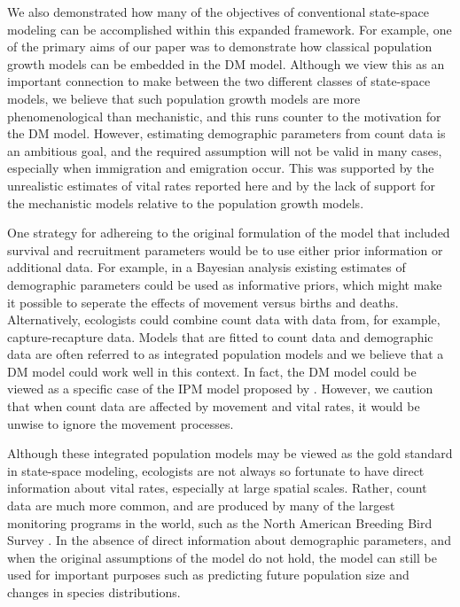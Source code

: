 \documentclass[12pt]{article}
\begin{document}
We also demonstrated how many of the objectives of conventional
state-space modeling can be accomplished within this expanded
framework. For example, one of the
primary aims of our paper was to demonstrate how classical
population growth models can be embedded in the DM model. Although we
view this as an important connection to make between the two different
classes of state-space models, we believe that
such population growth models are more phenomenological
than mechanistic, and this runs counter to the motivation for the DM
model. However, estimating
demographic parameters from count data is an ambitious goal, and
the required assumption will not be valid in many cases, especially
when immigration and emigration occur. This was supported by the
unrealistic estimates of vital rates reported here and by the lack of
support for the mechanistic models relative to the population growth
models.

One strategy for adhereing to the original formulation of the model
that included survival and recruitment parameters would be to use
either prior information or additional data. For example, in a
Bayesian analysis existing estimates of demographic parameters could
be used as informative priors, which might make it possible to
seperate the effects of movement versus births and deaths.
Alternatively, ecologists could combine count data with data from, for example,
capture-recapture data. Models that are fitted to count data and demographic data are
often referred to as integrated population models
\citep[IPM;][]{besbeas_etal:2002, buckland_etal:2004,schaub_etal:2007}
and we believe that a DM model could work well in this context.
In fact, the DM model could be viewed as a specific case of the
IPM model proposed by \citet{buckland_etal:2004}.
However, we caution that when count data are affected by movement
and vital rates, it would be unwise to ignore the movement processes.


Although these integrated
population models may be viewed as the gold standard in state-space
modeling, ecologists are not always so fortunate to have direct
information about vital rates, especially at large spatial scales.
Rather, count data are much more common, and
are produced by many of the largest monitoring programs in the world,
such as the North American Breeding Bird Survey
\citep[BBS;][]{robbins_etal:1986}.
In the absence of direct information about demographic parameters, and
when the original assumptions of the model do not hold, the model can
still be used for important purposes such as predicting future
population size and changes in species distributions.
\end{document}
